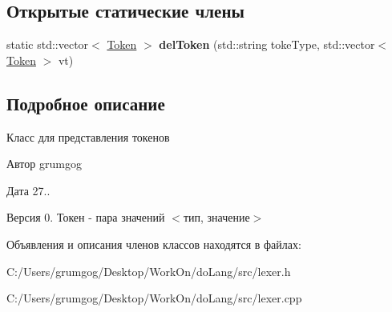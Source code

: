\subsection*{Открытые статические члены}
\begin{DoxyCompactItemize}
\item 
\mbox{\label{classlex_1_1_token_a193d4cafadd7b817046713be165da5ad}} 
static std\+::vector$<$ \mbox{\hyperlink{classlex_1_1_token}{Token}} $>$ {\bfseries del\+Token} (std\+::string toke\+Type, std\+::vector$<$ \mbox{\hyperlink{classlex_1_1_token}{Token}} $>$ vt)
\end{DoxyCompactItemize}


\subsection{Подробное описание}
Класс для представления токенов 

\begin{DoxyAuthor}{Автор}
grumgog 
\end{DoxyAuthor}
\begin{DoxyDate}{Дата}
27.. 
\end{DoxyDate}
\begin{DoxyVersion}{Версия}
0. Токен -\/ пара значений $<$тип, значение$>$ 
\end{DoxyVersion}


Объявления и описания членов классов находятся в файлах\+:\begin{DoxyCompactItemize}
\item 
C\+:/\+Users/grumgog/\+Desktop/\+Work\+On/do\+Lang/src/lexer.\+h\item 
C\+:/\+Users/grumgog/\+Desktop/\+Work\+On/do\+Lang/src/lexer.\+cpp\end{DoxyCompactItemize}
